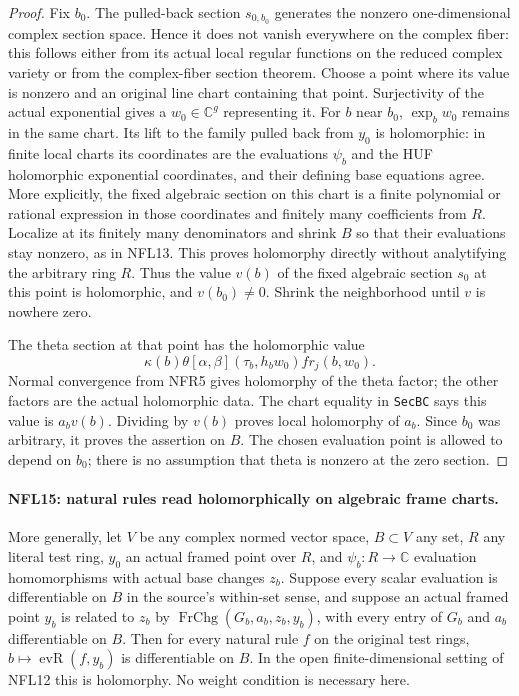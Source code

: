 \begin{proof}
Fix $b_0$.  The pulled-back section $s_{0,b_0}$ generates the
nonzero one-dimensional complex section space.  Hence it does
not vanish everywhere on the complex fiber: this follows
either from its actual local regular functions on the reduced
complex variety or from the complex-fiber section theorem.
Choose a point where its value is nonzero and an original
line chart containing that point.  Surjectivity of the actual
exponential gives a $w_0\in\mathbb C^g$ representing it.
For $b$ near $b_0$, $\exp_bw_0$ remains in the same chart.
Its lift to the family pulled back from $y_0$ is holomorphic:
in finite local charts its coordinates are the evaluations
$\psi_b$ and the HUF holomorphic exponential coordinates,
and their defining base equations agree.  More explicitly,
the fixed algebraic section on this chart is a finite
polynomial or rational expression in those coordinates and
finitely many coefficients from $R$.  Localize at its finitely
many denominators and shrink $B$ so that their evaluations
stay nonzero, as in NFL13.  This proves holomorphy directly
without analytifying the arbitrary ring $R$.
Thus the value $v(b)$ of the fixed algebraic section
$s_0$ at this point is holomorphic, and $v(b_0)\ne0$.
Shrink the neighborhood until $v$ is nowhere zero.

The theta section at that point has the holomorphic value
\[
 \kappa(b)\theta[\alpha,\beta](\tau_b,h_bw_0)fr_j(b,w_0).
\]
Normal convergence from NFR5 gives holomorphy of the theta
factor; the other factors are the actual holomorphic data.
The chart equality in \texttt{SecBC} says this value is
$a_bv(b)$.  Dividing by $v(b)$ proves local holomorphy of $a_b$.
Since $b_0$ was arbitrary, it proves the assertion on $B$.
The chosen evaluation point is allowed to depend on $b_0$;
there is no assumption that theta is nonzero at the zero section.
\end{proof}

\paragraph{NFL15: natural rules read holomorphically on algebraic frame charts.}
\label{claim:NFL15}
More generally, let $V$ be any complex normed vector space,
$B\subset V$ any set, $R$ any literal test ring, $y_0$ an
actual framed point over $R$, and $\psi_b:R\to\mathbb C$
evaluation homomorphisms with actual base changes $z_b$.
Suppose every scalar evaluation is differentiable on $B$ in
the source's within-set sense, and suppose an actual
framed point $y_b$ is related to $z_b$ by
$\operatorname{FrChg}(G_b,a_b,z_b,y_b)$, with every entry of
$G_b$ and $a_b$ differentiable on $B$.  Then for every natural
rule $f$ on the original test rings,
$b\mapsto\operatorname{evR}(f,y_b)$ is differentiable on $B$.
In the open finite-dimensional setting of NFL12 this is
holomorphy.  No weight condition is necessary here.

